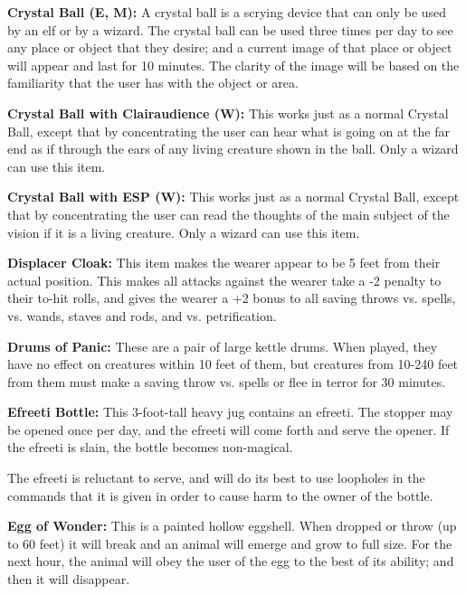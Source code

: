 \begin{multicols*}{2}
\textbf{Crystal Ball (E, M):} A crystal ball is a scrying device that can only be used by an elf or by a wizard. The crystal ball can be used three times per day to see any place or object that they desire; and a current image of that place or object will appear and last for 10 minutes. The clarity of the image will be based on the familiarity that the user has with the object or area.

\textbf{Crystal Ball with Clairaudience (W):} This works just as a normal Crystal Ball, except that by concentrating the user can hear what is going on at the far end as if through the ears of any living creature shown in the ball. Only a wizard can use this item.

\textbf{Crystal Ball with ESP (W):} This works just as a normal Crystal Ball, except that by concentrating the user can read the thoughts of the main subject of the vision if it is a living creature. Only a wizard can use this item.

\textbf{Displacer Cloak:} This item makes the wearer appear to be 5 feet from their actual position. This makes all attacks against the wearer take a -2 penalty to their to-hit rolls, and gives the wearer a +2 bonus to all saving throws vs. spells, vs. wands, staves and rods, and vs. petrification.

\textbf{Drums of Panic:} These are a pair of large kettle drums. When played, they have no effect on creatures within 10 feet of them, but creatures from 10-240 feet from them must make a saving throw vs. spells or flee in terror for 30 minutes.

\textbf{Efreeti Bottle:} This 3-foot-tall heavy jug contains an efreeti. The stopper may be opened once per day, and the efreeti will come forth and serve the opener. If the efreeti is slain, the bottle becomes non-magical.

The efreeti is reluctant to serve, and will do its best to use loopholes in the commands that it is given in order to cause harm to the owner of the bottle.

\textbf{Egg of Wonder:} This is a painted hollow eggshell. When dropped or throw (up to 60 feet) it will break and an animal will emerge and grow to full size. For the next hour, the animal will obey the user of the egg to the best of its ability; and then it will disappear.


\end{multicols*}

